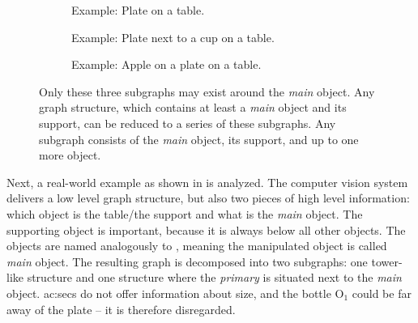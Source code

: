 \begin{figure}[]
  \begin{subfigure}[]{0.3\textwidth}
    \centering
    
    \caption{Example: Plate on a table.}
    \label{fig:sec_structuralinformation_structures_1}
  \end{subfigure}
  \hfill
  \begin{subfigure}[]{0.3\textwidth}
    \centering
    
    \caption{Example: Plate next to a cup on a table.}
    \label{fig:sec_structuralinformation_structures_2}
  \end{subfigure}
  \hfill
  \begin{subfigure}[]{0.3\textwidth}
    \centering
    
    \caption{Example: Apple on a plate on a table.}
    \label{fig:sec_structuralinformation_structures_3}
  \end{subfigure}
  \caption{Only these three subgraphs may exist around the \emph{main} object. Any graph structure, which contains at least a \emph{main} object and its support, can be reduced to a series of these subgraphs. Any subgraph consists of the \emph{main} object, its support, and up to one more object.}
  \label{fig:sec_structuralinformation_structures}
\end{figure}

Next, a real-world example as shown in  is analyzed.
The computer vision system delivers a low level graph structure, but also two pieces of high level information: which object is the table/the support and what is the \emph{main} object.
The supporting object is important, because it is always below all other objects.
The objects are named analogously to , meaning the manipulated object is called \emph{main} object.
The resulting graph is decomposed into two subgraphs: one tower-like structure and one structure where the \emph{primary} is situated next to the \emph{main} object.
\glspl{ac:sec} do not offer information about size, and the bottle O$_1$ could be far away of the plate -- it is therefore disregarded.

